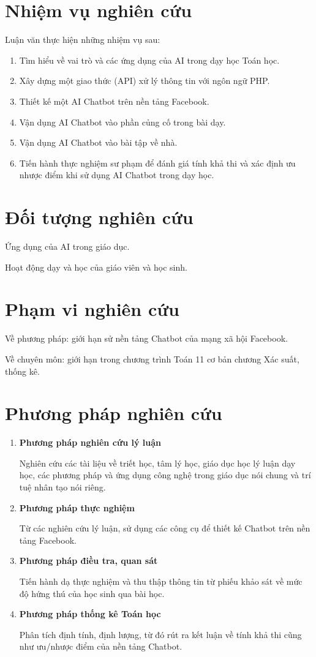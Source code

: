 \section{Nhiệm vụ nghiên cứu}
Luận văn thực hiện những nhiệm vụ sau:\par
\begin{enumerate}[label=\textbf{\thesection.\arabic*.},align=left,left=0cm..1cm]
	\item Tìm hiểu về vai trò và các ứng dụng của AI trong dạy học Toán học.
	\item Xây dựng một giao thức (API) xử lý thông tin với ngôn ngữ PHP.
	\item Thiết kế một AI Chatbot trên nền tảng Facebook.
	\item Vận dụng AI Chatbot vào phần củng cố trong bài dạy.
	\item Vận dụng AI Chatbot vào bài tập về nhà.
	\item Tiến hành thực nghiệm sư phạm để đánh giá tính khả thi và xác định ưu nhược điểm khi sử dụng AI Chatbot trong dạy học.
\end{enumerate}\par
\section{Đối tượng nghiên cứu}
Ứng dụng của AI trong giáo dục.\par
Hoạt động dạy và học của giáo viên và học sinh.\par
\section{Phạm vi nghiên cứu}
Về phương pháp: giới hạn sử nền tảng Chatbot của mạng xã hội Facebook.\par
Về chuyên môn: giới hạn trong chương trình Toán 11 cơ bản chương Xác suất, thống kê.\par
\section{Phương pháp nghiên cứu}
\begin{enumerate}[label=\textbf{\thesection.\arabic*.},align=left,left=0cm..1cm]
	\item \textbf{Phương pháp nghiên cứu lý luận}\par
	Nghiên cứu các tài liệu về triết học, tâm lý học, giáo dục học lý luận dạy học, các phương pháp và ứng dụng công nghệ trong giáo dục nói chung và trí tuệ nhân tạo nói riêng.
	\item \textbf{Phương pháp thực nghiệm} \par
	Từ các nghiên cứu lý luận, sử dụng các công cụ để thiết kế Chatbot trên nền tảng Facebook.
	\item \textbf{Phương pháp điều tra, quan sát} \par
	Tiến hành dạ thực nghiệm và thu thập thông tin từ phiếu khảo sát về mức độ hứng thú của học sinh qua bài học.
	\item \textbf{Phương pháp thống kê Toán học} \par
	Phân tích định tính, định lượng, từ đó rút ra kết luận về tính khả thi cũng như ưu/nhược điểm của nền tảng Chatbot.
\end{enumerate}
